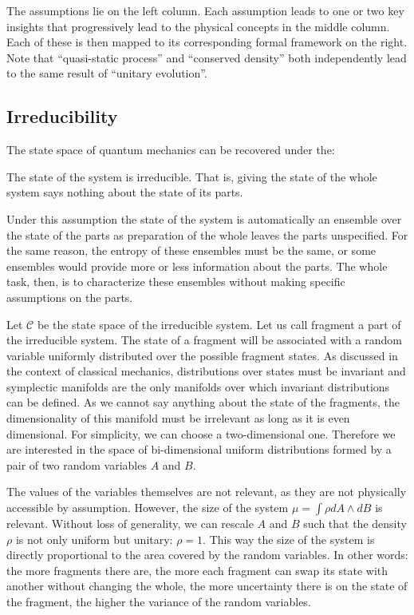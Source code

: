 \documentclass[11pt,letterpaper,fleqn]{memoir} %
\begin{document}
The assumptions lie on the left column. Each assumption leads to one or two key insights that progressively lead to the physical concepts in the middle column. Each of these is then mapped to its corresponding formal framework on the right. Note that ``quasi-static process'' and ``conserved density'' both independently lead to the same result of ``unitary evolution''.

\subsection{Irreducibility}

The state space of quantum mechanics can be recovered under the:

\begin{assump}[Irreducibility]
	The state of the system is irreducible. That is, giving the state of the whole system says nothing about the state of its parts.
\end{assump}

Under this assumption the state of the system is automatically an ensemble over the state of the parts as preparation of the whole leaves the parts unspecified. For the same reason, the entropy of these ensembles must be the same, or some ensembles would provide more or less information about the parts. The whole task, then, is to characterize these ensembles without making specific assumptions on the parts.

Let $\mathcal{C}$ be the state space of the irreducible system. Let us call fragment a part of the irreducible system. The state of a fragment will be associated with a random variable uniformly distributed over the possible fragment states. As discussed in the context of classical mechanics, distributions over states must be invariant and symplectic manifolds are the only manifolds over which invariant distributions can be defined. As we cannot say anything about the state of the fragments, the dimensionality of this manifold must be irrelevant as long as it is even dimensional. For simplicity, we can choose a two-dimensional one. Therefore we are interested in the space of bi-dimensional uniform distributions formed by a pair of two random variables $A$ and $B$.

The values of the variables themselves are not relevant, as they are not physically accessible by assumption. However, the size of the system $\mu = \int \rho dA \wedge dB$ is relevant. Without loss of generality, we can rescale $A$ and $B$ such that the density $\rho$ is not only uniform but unitary: $\rho = 1$. This way the size of the system is directly proportional to the area covered by the random variables. In other words: the more fragments there are, the more each fragment can swap its state with another without changing the whole, the more uncertainty there is on the state of the fragment, the higher the variance of the random variables.
\end{document}
